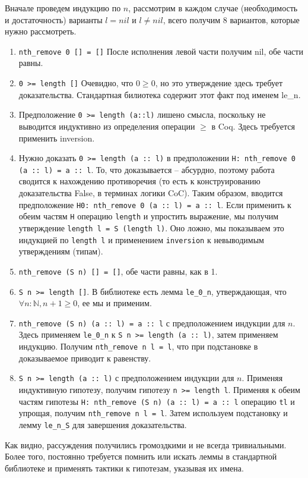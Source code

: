 Вначале проведем индукцию по $n$, рассмотрим в каждом случае (необходимость и достаточность) варианты $l = nil$ и $l \neq nil$, всего получим 8 вариантов, которые нужно рассмотреть.
\begin{enumerate}
\item \texttt{nth\_remove 0 [] = []} После исполнения левой части получим nil, обе части равны.
\item \texttt{0 >= length []} Очевидно, что $0 \geq 0$, но это утверждение здесь требует доказательства. Стандартная билиотека содержит этот факт под именем le\_n.
\item Предположение \texttt{0 >= length (a::l)} лишено смысла, поскольку не выводится индуктивно из определения операции $\geq$ в Coq. Здесь требуется применить inversion.
\item Нужно доказать \texttt{0 >= length (a :: l)} в предположении \texttt{H: nth\_remove 0 (a :: l) = a :: l}. То, что доказывается -- абсурдно, поэтому работа сводится к нахождению противоречия (то есть к конструированию доказательства False, в терминах логики CoC). Таким образом, вводится предположение \texttt{H0: nth\_remove 0 (a :: l) = a :: l}. Если применить к обеим частям \texttt{H} операцию \texttt{length} и упростить выражение, мы получим утверждение \texttt{length l = S (length l)}. Оно ложно, мы показываем это индукцией по \texttt{length l} и применением \texttt{inversion} к невыводимым утверждениям (типам).
\item \texttt{nth\_remove (S n) [] = []}, обе части равны, как в 1.
\item \texttt{S n >= length []}. В библиотеке есть лемма \texttt{le\_0\_n}, утверждающая, что $\forall n: \mathbb{N}, n + 1 \geq 0$, ее мы и применим.
\item \texttt{nth\_remove (S n) (a :: l) = a :: l} с предположением индукции для $n$. Здесь применяем \texttt{le\_0\_n} к \texttt{S n >= length (a :: l)}, затем применяем индукцию. Получим \texttt{nth\_remove n l = l}, что при подстановке в доказываемое приводит к равенству.
\item \texttt{S n >= length (a :: l)} с предположением индукции для $n$. Применяя индуктивную гипотезу, получим гипотезу \texttt{n >= length l}. Применяя к обеим частям гипотезы \texttt{H: nth\_remove (S n) (a :: l) = a :: l} операцию \texttt{tl} и упрощая, получим \texttt{nth\_remove n l = l}. Затем используем подстановку и лемму \texttt{le\_n\_S} для завершения доказательства.
\end{enumerate}

Как видно, рассуждения получились громоздкими и не всегда тривиальными. Более того, постоянно требуется помнить или искать леммы в стандартной библиотеке и применять тактики к гипотезам, указывая их имена.

